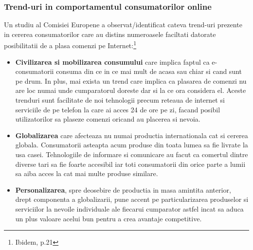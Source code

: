 \documentclass[a4paper, 12pt]{article}
\begin{document}
			\subsubsection{Trend-uri in comportamentul consumatorilor online} 
			Un studiu al Comisiei Europene a observat/identificat cateva trend-uri prezente in cererea consumatorilor care au distins numeroasele faciltati datorate posibilitatii de a plasa comenzi pe Internet:\footnote{Ibidem, p.21}
			\begin{itemize}
				\item \textbf{Civilizarea si mobilizarea consumului} care implica faptul ca e-consumatorii consuma din ce in ce mai mult de acasa sau chiar si cand sunt pe drum. In plus, mai exista un trend care implica ca plasarea de comenzi nu are loc numai unde cumparatorul doreste dar si la ce ora considera el. Aceste trenduri sunt facilitate de noi tehnologii precum reteaua de internet si serviciile de pe telefon la care ai acces 24 de ore pe zi, facand posibil utilizatorilor sa plaseze comenzi oricand au placerea si nevoia.
				\item \textbf{Globalizarea} care afecteaza nu numai productia internationala cat si cererea globala. Consumatorii asteapta acum produse din toata lumea sa fie livrate la usa casei. Tehnologiile de informare si comunicare au facut ca comertul dintre diverse tari sa fie foarte accesibil iar toti consumatorii din orice parte a lumii sa aiba acces la cat mai multe produse similare.
				\item \textbf{Personalizarea}, spre deosebire de productia in masa amintita anterior, drept componenta a globalizarii, pune accent pe particularizarea produselor si serviciilor la nevoile individuale ale fiecarui cumparator astfel incat sa aduca un plus valoare acelui bun pentru a crea avantaje competitive.
			\end{itemize}
\end{document}
